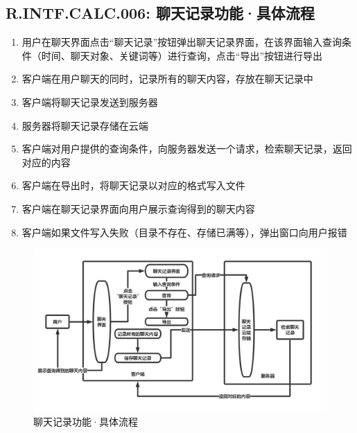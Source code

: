     \subsection{R.INTF.CALC.006: 聊天记录功能·具体流程}
    \begin{enumerate}
        \item 用户在聊天界面点击“聊天记录”按钮弹出聊天记录界面，在该界面输入查询条件（时间、聊天对象、关键词等）进行查询，点击“导出”按钮进行导出
        \item 客户端在用户聊天的同时，记录所有的聊天内容，存放在聊天记录中
        \item 客户端将聊天记录发送到服务器
        \item 服务器将聊天记录存储在云端
        \item 客户端对用户提供的查询条件，向服务器发送一个请求，检索聊天记录，返回对应的内容
        \item 客户端在导出时，将聊天记录以对应的格式写入文件
        \item 客户端在聊天记录界面向用户展示查询得到的聊天内容
        \item 客户端如果文件写入失败（目录不存在、存储已满等），弹出窗口向用户报错
    \end{enumerate}
        \begin{figure}[h]
            \centering
            \includegraphics[scale=0.4]{OutlineDesign/figures/聊天记录功能·具体流程.png}
            \caption{聊天记录功能·具体流程}
            \label{fig:server_flow}
        \end{figure}
